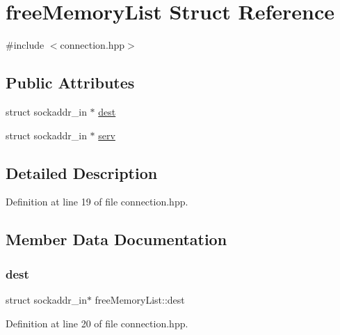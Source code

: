 \hypertarget{structfree_memory_list}{}\section{free\+Memory\+List Struct Reference}
\label{structfree_memory_list}


{\ttfamily \#include $<$connection.\+hpp$>$}

\subsection*{Public Attributes}
\begin{DoxyCompactItemize}
\item 
struct sockaddr\+\_\+in $\ast$ \hyperlink{structfree_memory_list_a5dad855c2ae6f4c6a4a639fd0ce546c2}{dest}
\item 
struct sockaddr\+\_\+in $\ast$ \hyperlink{structfree_memory_list_ac2bf3baf77ab770b01bff432f0203114}{serv}
\end{DoxyCompactItemize}


\subsection{Detailed Description}


Definition at line 19 of file connection.\+hpp.



\subsection{Member Data Documentation}
\mbox{\label{structfree_memory_list_a5dad855c2ae6f4c6a4a639fd0ce546c2}} 
\subsubsection{\texorpdfstring{dest}{dest}}
{\footnotesize\ttfamily struct sockaddr\+\_\+in$\ast$ free\+Memory\+List\+::dest}



Definition at line 20 of file connection.\+hpp.

\mbox{\label{structfree_memory_list_ac2bf3baf77ab770b01bff432f0203114}} 
